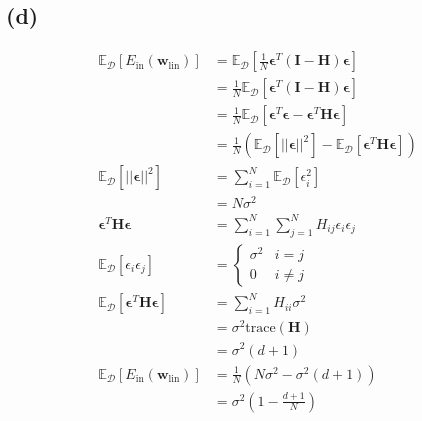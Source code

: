 \documentclass{article}
\begin{document}
	\subsection*{(d)}
		\begin{align*}
			\mathbb E_{\mathcal D}[E_\text{in}(\mathbf w_{\text{lin}})] &= \mathbb E_{\mathcal D}[ \frac1N\bm\epsilon^T(\mathbf I - \mathbf H)\bm\epsilon ]\\
			&= \frac1N\mathbb E_{\mathcal D}[ \bm\epsilon^T(\mathbf I - \mathbf H)\bm\epsilon ]\\
			&= \frac1N\mathbb E_{\mathcal D}[ \bm\epsilon^T\bm\epsilon - \bm\epsilon^T\mathbf H\bm\epsilon ]\\
			&= \frac1N(\mathbb E_{\mathcal D}[||\bm\epsilon||^2] - \mathbb E_{\mathcal D}[\bm\epsilon^T\mathbf H\bm\epsilon])\\
			\mathbb E_{\mathcal D}[||\bm\epsilon||^2] &= \sum\limits_{i=1}^N\mathbb E_{\mathcal D}[\epsilon_i^2]\\
			&=N\sigma^2\\
			\bm\epsilon^T\mathbf H\bm\epsilon &= \sum\limits_{i=1}^N\sum\limits_{j=1}^NH_{ij}\epsilon_i\epsilon_j\\
			\mathbb E_{\mathcal D}[\epsilon_i\epsilon_j] &=
			\begin{cases}
				\sigma^2 &i = j\\
				0 &i \neq j
			\end{cases}\\
			\mathbb E_{\mathcal D}[\bm\epsilon^T\mathbf H\bm\epsilon] &= \sum\limits_{i = 1}^NH_{ii}\sigma^2\\
			&= \sigma^2\text{trace}(\mathbf H)\\
			&= \sigma^2(d+1)\\
			\mathbb E_{\mathcal D}[E_\text{in}(\mathbf w_{\text{lin}})] &= \frac1N(N\sigma^2 - \sigma^2(d+1))\\
			&= \sigma^2(1 - \frac{d+1}N)
		\end{align*}
		
\end{document}
